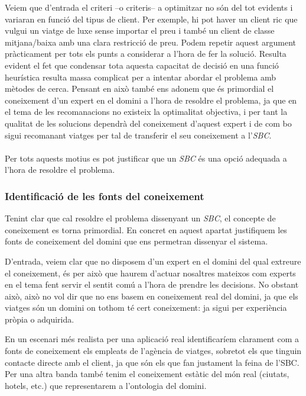 \documentclass[11pt,a4paper]{article}
\begin{document}
Veiem que d'entrada el criteri --o criteris-- a optimitzar no són del tot evidents i variaran en funció del tipus de client. Per exemple, hi pot haver un client ric que vulgui un viatge de luxe sense importar el preu i també un client de classe mitjana/baixa amb una clara restricció de preu. Podem repetir aquest argument pràcticament per tots els punts a considerar a l'hora de fer la solució. Resulta evident el fet que condensar tota aquesta capacitat de decisió en una funció heurística resulta massa complicat per a intentar abordar el problema amb mètodes de cerca. Pensant en això també ens adonem que és primordial el coneixement d'un expert en el domini a l'hora de resoldre el problema, ja que en el tema de les recomanacions no existeix la optimalitat objectiva, i per tant la qualitat de les solucions dependrà del coneixement d'aquest expert i de com bo sigui recomanant viatges per tal de transferir el seu coneixement a l'\emph{SBC}. \\\\ Per tots aquests motius es pot justificar que un \emph{SBC} és una opció adequada a l'hora de resoldre el problema.

\subsubsection{Identificació de les fonts del coneixement}
Tenint clar que cal resoldre el problema dissenyant un \emph{SBC}, el concepte de coneixement es torna primordial. En concret en aquest apartat justifiquem les fonts de coneixement del domini que ens permetran dissenyar el sistema.

D'entrada, veiem clar que no disposem d'un expert en el domini del qual extreure el coneixement, és per això que haurem d'actuar nosaltres mateixos com experts en el tema fent servir el sentit comú a l'hora de prendre les decisions. No obstant això, això no vol dir que no ens basem en coneixement real del domini, ja que els viatges són un domini on tothom té cert coneixement: ja sigui per experiència pròpia o adquirida.

En un escenari més realista per una aplicació real identificaríem clarament com a fonts de coneixement els empleats de l'agència de viatges, sobretot els que tinguin contacte directe amb el client, ja que són els que fan justament la feina de l'SBC. Per una altra banda també tenim el coneixement estàtic del món real (ciutats, hotels, etc.) que representarem a l'ontologia del domini.


\end{document}
